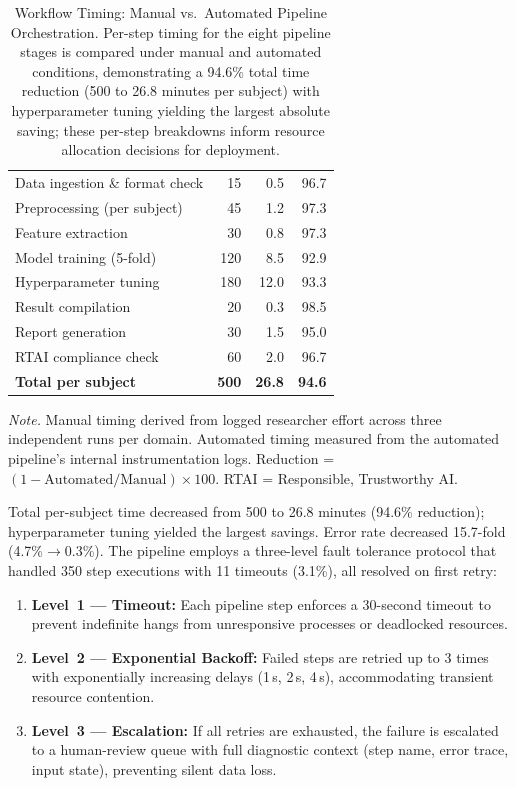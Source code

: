 \begin{table}[!htbp]
\tablestripes\tablefontsize
\tablefontsize
\caption[Manual vs.\ Automated Pipeline Timing]{Workflow Timing: Manual vs.\ Automated Pipeline Orchestration. Per-step timing for the eight pipeline stages is compared under manual and automated conditions, demonstrating a 94.6\% total time reduction (500 to 26.8 minutes per subject) with hyperparameter tuning yielding the largest absolute saving; these per-step breakdowns inform resource allocation decisions for deployment.}
\begin{tabularx}{\textwidth}{@{} L r r r @{}}
\toprule
{} &  &  &  \\
\midrule
Data ingestion \& format check & 15 & 0.5 & 96.7 \\
Preprocessing (per subject) & 45 & 1.2 & 97.3 \\
Feature extraction & 30 & 0.8 & 97.3 \\
Model training (5-fold) & 120 & 8.5 & 92.9 \\
Hyperparameter tuning & 180 & 12.0 & 93.3 \\
Result compilation & 20 & 0.3 & 98.5 \\
Report generation & 30 & 1.5 & 95.0 \\
RTAI compliance check & 60 & 2.0 & 96.7 \\
\midrule
\textbf{Total per subject} & \textbf{500} & \textbf{26.8} & \textbf{94.6} \\
\bottomrule
\end{tabularx}
\vspace{0.5em}\noindent\textit{Note.} Manual timing derived from logged researcher effort across three independent runs per domain. Automated timing measured from the automated pipeline's internal instrumentation logs. Reduction = $(1 - \text{Automated} / \text{Manual}) \times 100$. RTAI = Responsible, Trustworthy AI.
\end{table}

Total per-subject time decreased from 500 to 26.8 minutes (94.6\% reduction); hyperparameter tuning yielded the largest savings. Error rate decreased 15.7-fold (4.7\%$\to$0.3\%). The pipeline employs a three-level fault tolerance protocol that handled 350 step executions with 11 timeouts (3.1\%), all resolved on first retry:

\begin{enumerate}[leftmargin=*, itemsep=3pt]
    \item \textbf{Level~1 --- Timeout:} Each pipeline step enforces a 30-second timeout to prevent indefinite hangs from unresponsive processes or deadlocked resources.
    \item \textbf{Level~2 --- Exponential Backoff:} Failed steps are retried up to 3 times with exponentially increasing delays (1\,s, 2\,s, 4\,s), accommodating transient resource contention.
    \item \textbf{Level~3 --- Escalation:} If all retries are exhausted, the failure is escalated to a human-review queue with full diagnostic context (step name, error trace, input state), preventing silent data loss.
\end{enumerate}

